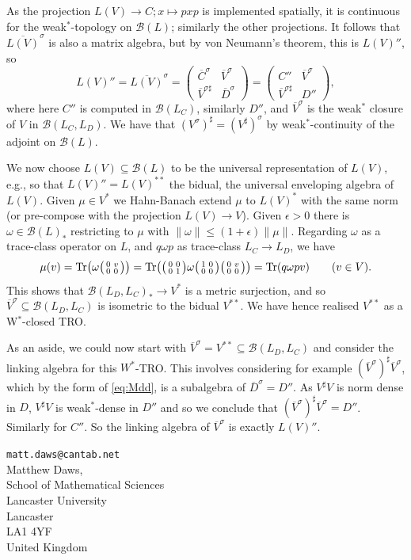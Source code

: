 \documentclass[a4paper,11pt]{article}
\theoremstyle{plain}
\theoremstyle{remark}
\newcommand{\mc}[1]{\mathcal{#1}}
\newcommand{\Tr}{{\operatorname{Tr}}}
\newenvironment{smat}{\bigl(\begin{smallmatrix}}{\end{smallmatrix}\bigr)}
\newcommand{\smattwo}[4]{\begin{smat}{#1}&{#2}\\{#3}&{#4}\end{smat}}
\begin{document}
As the projection $L(V)\to C; x\mapsto pxp$ is implemented spatially, it is continuous for the weak$^*$-topology on $\mc B(L)$; similarly the other projections.  It follows that $\overline{L(V)}^\sigma$ is also a matrix algebra, but by von Neumann's theorem, this is $L(V)''$, so
\begin{equation}\label{eq:Mdd}
L(V)'' = \overline{L(V)}^\sigma
= \begin{pmatrix} \overline{C}^\sigma & \overline{V}^{\sigma} \\ \overline{V}^{\sigma \sharp} & \overline{D}^\sigma \end{pmatrix}
= \begin{pmatrix} C'' & \overline{V}^{\sigma} \\ \overline{V}^{\sigma\sharp} & D'' \end{pmatrix},
\end{equation}
where here $C''$ is computed in $\mc B(L_C)$, similarly $D''$, and $\overline{V}^\sigma$ is the weak$^*$ closure of $V$ in $\mc B(L_C, L_D)$.  We have that $(V^\sigma)^\sharp = (V^\sharp)^\sigma$ by weak$^*$-continuity of the adjoint on $\mc B(L)$.

We now choose $L(V) \subseteq \mc B(L)$ to be the universal representation of $L(V)$, e.g.\@ \cite[Definition~III.2.3]{TakesakiI}, so that $L(V)'' = L(V)^{**}$ the bidual, the universal enveloping algebra of $L(V)$.  Given $\mu\in V^*$ we Hahn-Banach extend $\mu$ to $L(V)^*$ with the same norm (or pre-compose with the projection $L(V)\to V$).  Given $\epsilon>0$ there is $\omega\in\mc B(L)_*$ restricting to $\mu$ with $\|\omega\| \leq (1+\epsilon)\|\mu\|$.  Regarding $\omega$ as a trace-class operator on $L$, and $q\omega p$ as trace-class $L_C \to L_D$, we have
\[ \mu(v) = \Tr\bigl( \omega \smattwo{0}{v}{0}{0} \bigr)
= \Tr\bigl( \smattwo{0}{0}{0}{1} \omega \smattwo{1}{0}{0}{0} \smattwo{0}{v}{0}{0} \bigr)
= \Tr(q\omega p v) \qquad (v\in V). \]
This shows that $\mc B(L_D, L_C)_* \to V^*$ is a metric surjection, and so $\overline{V}^\sigma \subseteq \mc B(L_D, L_C)$ is isometric to the bidual $V^{**}$.  We have hence realised $V^{**}$ as a W$^*$-closed TRO.

As an aside, we could now start with $\overline{V}^\sigma = V^{**} \subseteq \mc B(L_D, L_C)$ and consider the linking algebra for this $W^*$-TRO.  This involves considering for example $(\overline{V}^\sigma)^\sharp \overline{V}^\sigma$, which by the form of \eqref{eq:Mdd}, is a subalgebra of $\overline{D}^\sigma = D''$.  As $V^\sharp V$ is norm dense in $D$, $V^\sharp V$ is weak$^*$-dense in $D''$ and so we conclude that $(\overline{V}^\sigma)^\sharp \overline{V}^\sigma = D''$.  Similarly for $C''$.  So the linking algebra of $\overline{V}^\sigma$ is exactly $L(V)''$.





\noindent
\texttt{matt.daws@cantab.net} \\
Matthew Daws,  \\
School of Mathematical Sciences \\
Lancaster University \\
Lancaster \\
LA1 4YF \\
United Kingdom
\end{document}
